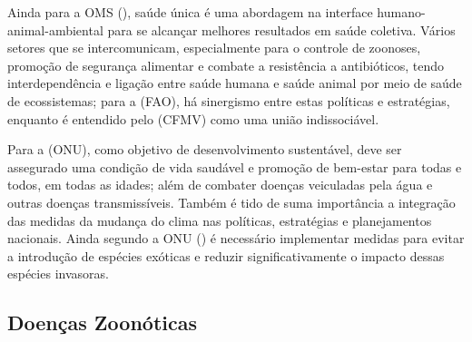 
\indent Ainda para a \acrshort{OMS} (\citeyear{OMS2022S1}), saúde única é uma abordagem na interface humano-animal-ambiental para se alcançar melhores resultados em saúde coletiva. Vários setores que se intercomunicam, especialmente para o controle de zoonoses, promoção de segurança alimentar e combate a resistência a antibióticos, tendo interdependência e ligação entre saúde humana e saúde animal por meio de saúde de ecossistemas; para a  (\acrshort{FAO}), há sinergismo entre estas políticas e estratégias, enquanto é entendido pelo  (\acrshort{CFMV}) como uma união indissociável.

\indent Para a  (\acrshort{ONU}), como objetivo de desenvolvimento sustentável, deve ser assegurado uma condição de vida saudável e promoção de bem-estar para todas e todos, em todas as idades; além de combater doenças veiculadas pela água e outras doenças transmissíveis. Também é tido de suma importância a integração das medidas da mudança do clima nas políticas, estratégias e planejamentos nacionais. Ainda segundo a \acrshort{ONU} (\citeyear{ONUODS22}) é necessário implementar medidas para evitar a introdução de espécies exóticas e reduzir significativamente o impacto dessas espécies invasoras.

\subsection{Doenças Zoonóticas}


